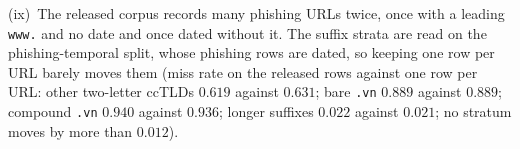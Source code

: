(ix)~The released corpus records many phishing URLs twice, once with a leading \texttt{www.} and no date and once dated without it. The suffix strata are read on the phishing-temporal split, whose phishing rows are dated, so keeping one row per URL barely moves them (miss rate on the released rows against one row per URL: other two-letter ccTLDs $0.619$ against $0.631$; bare \texttt{.vn} $0.889$ against $0.889$; compound \texttt{.vn} $0.940$ against $0.936$; longer suffixes $0.022$ against $0.021$; no stratum moves by more than $0.012$).%
